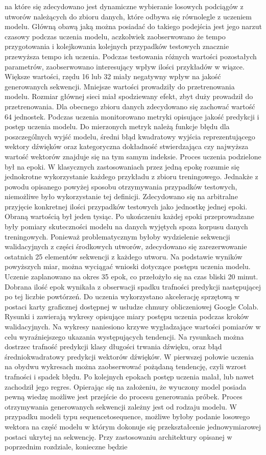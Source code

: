 na które się zdecydowano jest dynamiczne wybieranie losowych podciągów z utworów należących do zbioru danych, które odbywa się równolegle z uczeniem modelu.  Główną obawą jaką można posiadać do takiego podejścia jest jego narzut czasowy podczas uczenia modelu,  aczkolwiek zaobserwowano że tempo przygotowania i kolejkowania kolejnych przypadków testowych znacznie przewyższa tempo ich uczenia. Podczas testowania różnych wartości pozostałych parametrów, zaobserwowano interesujący wpływ ilości przykładów w wiązce. Większe wartości, rzędu 16 lub 32 miały negatywny wpływ na jakość generowanych sekwencji.  Mniejsze wartości prowadziły do przetrenowania modelu. Rozmiar głównej sieci miał spodziewany efekt, zbyt duży prowadził do przetrenowania. Dla obecnego zbioru danych zdecydowano się zachować wartość 64 jednostek. Podczas uczenia monitorowano metryki opisujące jakość predykcji i postęp uczenia modelu. Do mierzonych metryk należą funkcje błędu dla poszczególnych wyjść modelu, średni błąd kwadratowy wyjścia reprezentującego wektory dźwięków oraz kategoryczna dokładność stwierdzająca czy najwyższa wartość wektorów znajduje się na tym samym indeksie. Proces uczenia podzielone był na epoki. W klasycznych zastosowaniach przez jedną epokę rozumie się jednokrotne wykorzystanie każdego przykładu z zbioru treningowego. Jednakże z powodu opisanego powyżej sposobu otrzymywania przypadków testowych, niemożliwe było wykorzystanie tej definicji. Zdecydowano się na arbitralne przyjęcie konkretnej  ilości przypadków testowych jako jednostkę jednej epoki. Obraną wartością był jeden tysiąc. Po ukończeniu każdej epoki przeprowadzane były pomiary skuteczności modelu na danych wyjętych spoza korpusu  danych treningowych. Ponieważ problematycznym byłoby wydzielenie sekwencji walidacyjnych z części środkowych utworów, zdecydowano się zarezerwowanie ostatnich 25 elementów sekwencji z każdego utworu. Na podstawie wyników powyższych miar, można wyciągać wnioski dotyczące postępu uczenia modelu. Uczenie zaplanowano na okres 35 epok, co przełożyło się na czas bliski 20 minut. Dobrana ilość epok wynikała  z obserwacji spadku trafności predykcji następującej po tej liczbie powtórzeń. Do uczenia wykorzystano akcelerację sprzętową w postaci karty graficznej dostępnej w usłudze chmury obliczeniowej Google Colab. Rysunki  i  zawierają wykresy opisujące miary postępu uczenia podczas kroków walidacyjnych. Na wykresy naniesiono krzywe wygładzające wartości pomiarów w celu wyraźniejszego ukazania występujących tendencji. Na rysunkach można dostrzec trafność predykcji klasy długości trwania dźwięku, oraz błąd średniokwadratowy predykcji wektorów dźwięków. W pierwszej połowie uczenia na obydwu wykresach można zaobserwować pożądaną tendencję, czyli wzrost trafności i spadek błędu. Po kolejnych epokach postęp uczenia malał, lub nawet zachodził jego regres. Opierając się na założeniu, że wyuczony model posiada pewną wiedzę możliwe jest przejście do procesu generowania próbek. Proces otrzymywania generowanych sekwencji zależny jest od rodzaju modelu. W przypadku modeli typu sequencetosequence, możliwe byłoby podanie losowego  wektora na część modelu w którym dokonuje się przekształcenie jednowymiarowej postaci ukrytej na sekwencję. Przy zastosowaniu architektury opisanej w poprzednim rozdziale, konieczne będzie  